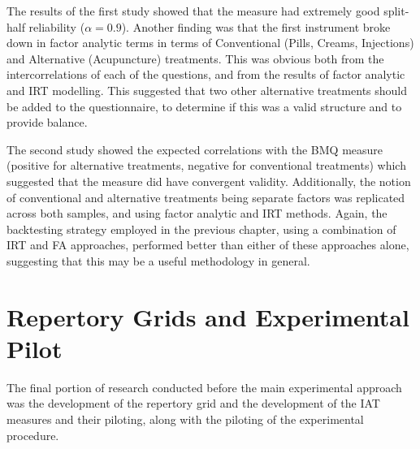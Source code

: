 The results of the first study showed that the measure had extremely good split-half reliability ($ \alpha=0.9$). Another finding was that the first instrument broke down in factor analytic terms in terms of Conventional (Pills, Creams, Injections) and Alternative (Acupuncture) treatments. This was obvious both from the intercorrelations of each of the questions, and from the results of factor analytic and IRT modelling. This suggested that two other alternative treatments should be added to the questionnaire, to determine if this was a valid structure and to provide balance. 

The second study showed the expected correlations  with the BMQ measure (positive for alternative treatments, negative for conventional treatments) which suggested that the measure did have convergent validity. Additionally, the notion of conventional and alternative treatments being separate factors was replicated across both samples, and using factor analytic and IRT methods. Again, the backtesting strategy employed in the previous chapter, using a combination of IRT and FA approaches, performed better than either of these approaches alone, suggesting that this may be a useful methodology in general. 


\section{Repertory Grids and Experimental Pilot}
\label{sec:qual-rese-rep}

The final portion of research conducted before the main experimental approach was the development of the repertory grid and the development of the IAT measures and their piloting, along with the piloting of the experimental procedure. 


